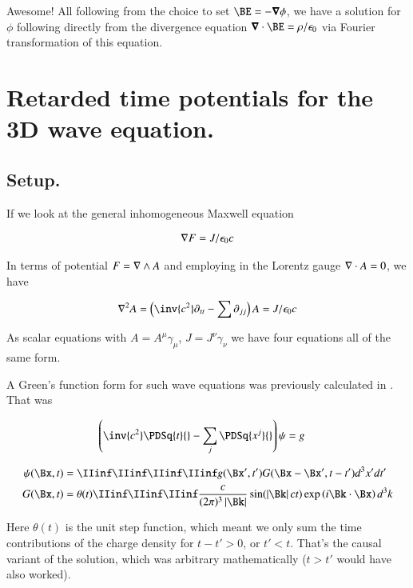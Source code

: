 Awesome!  All following from the choice to set $\BE = -\spacegrad \phi$, we have a solution for $\phi$ following directly
from the divergence equation $\spacegrad \cdot \BE = \rho/\epsilon_0$ via Fourier transformation of this equation.

\section{Retarded time potentials for the 3D wave equation. }

\subsection{Setup. }

If we look at the general inhomogeneous Maxwell equation

\begin{align}
\nabla F = J/\epsilon_0 c
\end{align}

In terms of potential $F = \nabla \wedge A$ and employing in the Lorentz gauge $\nabla \cdot A = 0$, we have

\begin{align}
\grad^2 A = \left(\inv{c^2} \partial_{tt} - \sum \partial_{jj}\right) A = J/\epsilon_0 c
\end{align}

As scalar equations with $A = A^\mu \gamma_\mu$, $J = J^\nu \gamma_\nu$ we have four equations all of the same form.

A Green's function form for such wave equations was previously calculated in .  That was

\begin{align}
\left( \inv{c^2} \PDSq{t}{} -\sum_j \PDSq{x^j}{} \right)\psi &= g
\end{align}

\begin{align}
{\psi}(\Bx, t) &= \IIinf \IIinf \IIinf \IIinf g(\Bx', t') G(\Bx - \Bx', t - t') d^3 x' dt' \\
G(\Bx, t) &= \theta(t) \IIinf \IIinf \IIinf \frac{c}{(2\pi)^3 \Abs{\Bk}} \sin( \Abs{\Bk} c t ) \exp\left( i \Bk \cdot \Bx \right) d^3 k
\end{align}

Here $\theta(t)$ is the unit step function, which meant we only sum the time contributions of the charge density for $t - t' > 0$, or $t' < t$.  That's the causal variant of the solution, which was arbitrary mathematically ($t > t'$ would have also worked).

